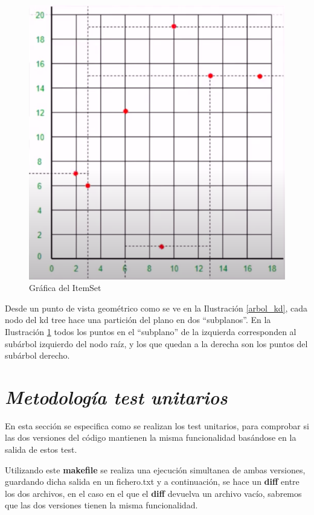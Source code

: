 \documentclass{cosas/tfg_domingo}
\begin{document}
\begin{figure}[h]
\begin{center}
\includegraphics[width=.4\linewidth]{imagenes/kdtree2.png}
\end{center}
\caption{Gráfica del ItemSet}
\label{grafica_kd}
\end{figure}

Desde un punto de vista geométrico como se ve en la Ilustración \ref{arbol_kd}, cada nodo del kd tree hace una partición del plano en dos “subplanos”. En la Ilustración \ref{grafica_kd} todos los puntos en el “subplano” de la izquierda corresponden al subárbol izquierdo del nodo raíz, y los que quedan a la derecha son los puntos del subárbol derecho.


\chapter{\emph{Metodología test unitarios}}

En esta sección se especifica como se realizan los test unitarios, para comprobar si las dos versiones del código mantienen la misma funcionalidad basándose en la salida de estos test.

\hfill



Utilizando este \textbf{makefile} se realiza una ejecución simultanea de ambas versiones, guardando dicha salida en un fichero.txt y a continuación, se hace un \textbf{diff} entre los dos archivos, en el caso en el que el \textbf{diff} devuelva un archivo vacío, sabremos que las dos versiones tienen la misma funcionalidad.


\end{document}
